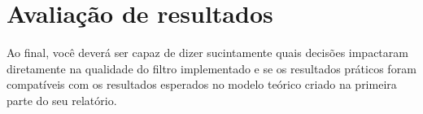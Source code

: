 \documentclass[a4paper, 12pt]{article}
\begin{document}
\newpage

\section{Avaliação de resultados}
Ao final, você deverá ser capaz de dizer sucintamente quais decisões impactaram diretamente na qualidade do filtro implementado e se os resultados práticos foram compatíveis com os resultados esperados no modelo teórico criado na primeira parte do seu relatório.
\newpage
\end{document}
